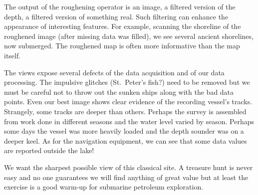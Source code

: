 
\par
The output of the roughening operator is an image,
a filtered version of the depth,
a filtered version of something real.
Such filtering can enhance the appearance of interesting features.
For example,
scanning the shoreline of the roughened image
(after missing data was filled),
we see several ancient shorelines, now submerged.
The roughened map is often more informative than the map itself.
\par
The views expose several defects
of the data acquisition and of our data processing.
The impulsive glitches (St.~Peter's fish?)
need to be removed but we must be careful not to throw
out the sunken ships along with the bad data points.
Even our best image shows clear evidence of the recording vessel's tracks.
Strangely, some tracks are deeper than others.
Perhaps the survey is assembled from work done in different seasons
and the water level varied by season.
Perhaps some days the vessel was more heavily loaded
and the depth sounder was on a deeper keel.
As for the navigation equipment,
we can see that some data values are reported outside the lake!
\par
We want the sharpest possible view
of this classical site.
A treasure hunt is never easy
and no one guarantees we will
find anything of great value
but at least the exercise is a good warm-up
for submarine petroleum exploration.


